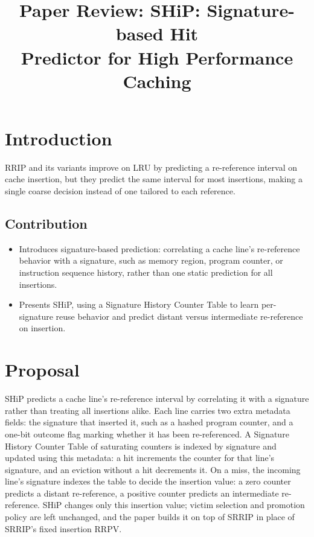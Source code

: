 \documentclass[10pt, conference]{IEEEtran}
\begin{document}
\title{\Large\bfseries Paper Review: SHiP: Signature-based Hit\\Predictor for High Performance Caching}

\author{
}

\maketitle

\section{Introduction}
RRIP and its variants improve on LRU by predicting a re-reference interval on cache insertion, but they predict the same interval for most insertions, making a single coarse decision instead of one tailored to each reference.

\subsection{Contribution}
\begin{itemize}[leftmargin=*, itemsep=0pt, topsep=1pt, parsep=0pt]
    \item Introduces signature-based prediction: correlating a cache line's re-reference behavior with a signature, such as memory region, program counter, or instruction sequence history, rather than one static prediction for all insertions.
    \item Presents SHiP, using a Signature History Counter Table to learn per-signature reuse behavior and predict distant versus intermediate re-reference on insertion.
\end{itemize}

\section{Proposal}
SHiP predicts a cache line's re-reference interval by correlating it with a signature rather than treating all insertions alike. Each line carries two extra metadata fields: the signature that inserted it, such as a hashed program counter, and a one-bit outcome flag marking whether it has been re-referenced. A Signature History Counter Table of saturating counters is indexed by signature and updated using this metadata: a hit increments the counter for that line's signature, and an eviction without a hit decrements it. On a miss, the incoming line's signature indexes the table to decide the insertion value: a zero counter predicts a distant re-reference, a positive counter predicts an intermediate re-reference. SHiP changes only this insertion value; victim selection and promotion policy are left unchanged, and the paper builds it on top of SRRIP in place of SRRIP's fixed insertion RRPV.
\end{document}
